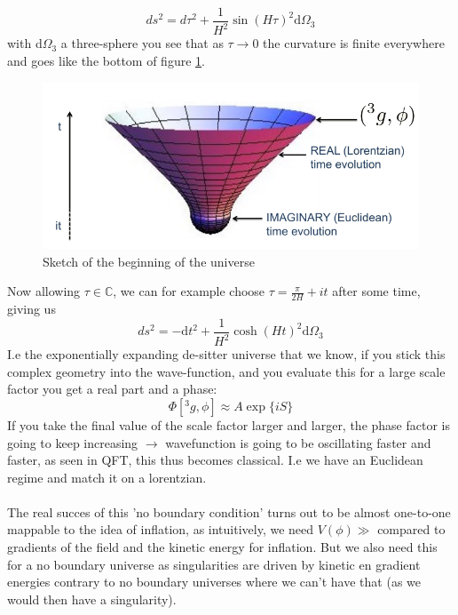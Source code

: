 \documentclass{article}
\begin{document}
  \begin{equation}
  ds^2 = d\tau^2 + \frac{1}{H^2}\sin(H\tau)^2\text{d}\Omega_3
  \end{equation}
  with d$\Omega_3$ a three-sphere you see that as $\tau \rightarrow 0$ the curvature is finite everywhere and goes like the bottom of figure \ref{fig:UniverseStart}. 
  \begin{figure}
    \includegraphics[width=\textwidth]{Universe_Start.png}
    \caption{Sketch of the beginning of the universe}
    \label{fig:UniverseStart}
  \end{figure}
  Now allowing $\tau \in \mathbb{C}$, we can for example choose $\tau = \frac{\pi}{2H} + it$ after some time, giving us
  \begin{equation}
    ds^2 = -\text{d}t^2 + \frac{1}{H^2}\cosh(Ht)^2 \text{d}\Omega_3
  \end{equation}
  I.e the exponentially expanding de-sitter universe that we know, if you stick this complex geometry into the wave-function, and you evaluate this for a large scale factor you get a real part and a phase:
  \begin{equation}
    \Phi[^3g,\phi] \approx A\exp\{iS\}
  \end{equation}
   If you take the final value of the scale factor larger and larger, the phase factor is going to keep increasing $\rightarrow$ wavefunction is going to be oscillating faster and faster, as seen in QFT, this thus becomes classical. 
   I.e we have an Euclidean regime and match it on a lorentzian.
  \\\\
  The real succes of this 'no boundary condition' turns out to be almost one-to-one mappable to the idea of inflation, as intuitively, we need $V(\phi)\gg$ compared to gradients of the field and the kinetic energy for inflation. But we also need this for a no boundary universe as singularities are driven by kinetic en gradient energies contrary to no boundary universes where we can't have that (as we would then have a singularity).
\end{document}
